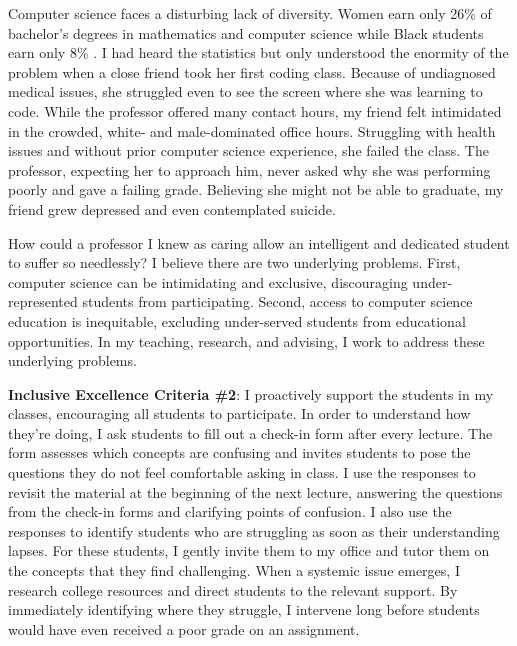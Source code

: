 \documentclass[11pt]{article}
\begin{document}
{\setlength{\parindent}{0cm}

Computer science faces a disturbing lack of diversity. Women earn only 26\% of bachelor's degrees in mathematics and computer science while Black students earn only 8\% \cite{national2023diversity}. I had heard the statistics but only understood the enormity of the problem when a close friend took her first coding class. Because of undiagnosed medical issues, she struggled even to see the screen where she was learning to code. While the professor offered many contact hours, my friend felt intimidated in the crowded, white- and male-dominated office hours. Struggling with health issues and without prior computer science experience, she failed the class. The professor, expecting her to approach him, never asked why she was performing poorly and gave a failing grade. Believing she might not be able to graduate, my friend grew depressed and even contemplated suicide.

How could a professor I knew as caring allow an intelligent and dedicated student to suffer so needlessly? I believe there are two underlying problems. First, computer science can be intimidating and exclusive, discouraging under-represented students from participating. Second, access to computer science education is inequitable, excluding under-served students from educational opportunities. In my teaching, research, and advising, I work to address these underlying problems.

\textbf{Inclusive Excellence Criteria \#2}:
I proactively support the students in my classes, encouraging all students to participate. In order to understand how they're doing, I ask students to fill out a check-in form after every lecture. The form assesses which concepts are confusing and invites students to pose the questions they do not feel comfortable asking in class. I use the responses to revisit the material at the beginning of the next lecture, answering the questions from the check-in forms and clarifying points of confusion. I also use the responses to identify students who are struggling as soon as their understanding lapses. For these students, I gently invite them to my office and tutor them on the concepts that they find challenging. When a systemic issue emerges, I research college resources and direct students to the relevant support. By immediately identifying where they struggle, I intervene long before students would have even received a poor grade on an assignment.

}
\end{document}
